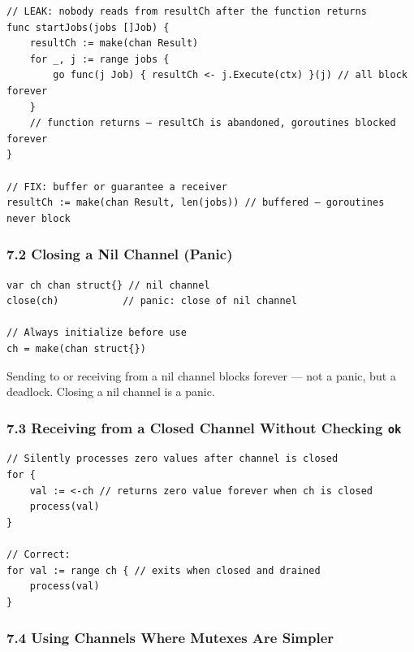 \documentclass[11pt,a4paper,oneside]{book}
\begin{document}
\begin{verbatim}
// LEAK: nobody reads from resultCh after the function returns
func startJobs(jobs []Job) {
    resultCh := make(chan Result)
    for _, j := range jobs {
        go func(j Job) { resultCh <- j.Execute(ctx) }(j) // all block forever
    }
    // function returns — resultCh is abandoned, goroutines blocked forever
}

// FIX: buffer or guarantee a receiver
resultCh := make(chan Result, len(jobs)) // buffered — goroutines never block
\end{verbatim}

\subsubsection{7.2 Closing a Nil Channel
(Panic)}

\begin{verbatim}
var ch chan struct{} // nil channel
close(ch)           // panic: close of nil channel

// Always initialize before use
ch = make(chan struct{})
\end{verbatim}

Sending to or receiving from a nil channel blocks forever --- not a
panic, but a deadlock. Closing a nil channel is a panic.

\subsubsection{\texorpdfstring{7.3 Receiving from a Closed Channel
Without Checking
\texttt{ok}}{7.3 Receiving from a Closed Channel Without Checking ok}}

\begin{verbatim}
// Silently processes zero values after channel is closed
for {
    val := <-ch // returns zero value forever when ch is closed
    process(val)
}

// Correct:
for val := range ch { // exits when closed and drained
    process(val)
}
\end{verbatim}

\subsubsection{7.4 Using Channels Where Mutexes Are
Simpler}
\end{document}

